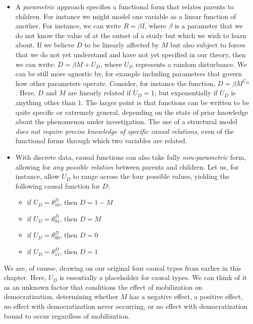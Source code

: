 \documentclass[12pt,]{book}
\providecommand{\tightlist}{%
  \setlength{\itemsep}{0pt}\setlength{\parskip}{0pt}}
\begin{document}
\begin{itemize}
\tightlist
\item
  A \emph{parametric} approach specifies a functional form that relates parents to children. For instance we might model one variable as a linear function of another. For instance, we can write \(R=\beta I\), where \(\beta\) is a parameter that we do not know the value of at the outset of a study but which we wish to learn about. If we believe \(D\) to be linearly affected by \(M\) but also subject to forces that we do not yet understand and have not yet specified in our theory, then we can write: \(D=\beta M+U_D\), where \(U_D\) represents a random disturbance. We can be still more agnostic by, for example including parameters that govern how other parameters operate. Consider, for instance the function, \(D=\beta M^{U_D}\). Here, \(D\) and \(M\) are linearly related if \(U_D=1\), but exponentially if \(U_D\) is anything other than \(1\). The larger point is that functions can be written to be quite specific or extremely general, depending on the state of prior knowledge about the phenomenon under investigation. The use of a structural model \emph{does not require precise knowledge of specific causal relations}, even of the functional forms through which two variables are related.
\end{itemize}

\begin{itemize}
\tightlist
\item
  With discrete data, causal functions can also take fully \emph{non-parametric} form, allowing for \emph{any possible relation} between parents and children. Let us, for instance, allow \(U_D\) to range across the four possible values, yielding the following causal function for \(D\):

  \begin{itemize}
  \tightlist
  \item
    if \(U_D=\theta^D_{10}\), then \(D=1-M\)
  \item
    if \(U_D=\theta^D_{01}\), then \(D=M\)
  \item
    if \(U_D=\theta^D_{00}\), then \(D=0\)
  \item
    if \(U_D=\theta^D_{11}\), then \(D=1\)
  \end{itemize}
\end{itemize}

We are, of course, drawing on our original four causal types from earlier in this chapter. Here, \(U_D\) is essentially a placeholder for causal types. We can think of it as an unknown factor that conditions the effect of mobilization on democratization, determining whether \(M\) has a negative effect, a positive effect, no effect with democratization never occurring, or no effect with democratization bound to occur regardless of mobilization.
\end{document}
